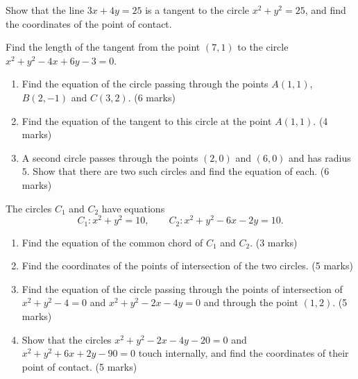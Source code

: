 \documentclass[11pt]{article}
\newcounter{popsec}
\newcounter{popsub}
\newcommand{\courssub}[1]{%
  \stepcounter{popsub}%
  \par\vspace{9pt}\noindent{\popxbold\fontsize{11.5}{13}\selectfont\color{popink}{\color{poporange}\thepopsec.\thepopsub}\hspace{6pt}#1}\par\nopagebreak\vspace{4pt}
}
\begin{document}
\begin{exercice}
Show that the line $3x + 4y = 25$ is a tangent to the circle $x^2 + y^2 = 25$, and find the coordinates of the point of contact.
\end{exercice}

\begin{exercice}
Find the length of the tangent from the point $(7, 1)$ to the circle $x^2 + y^2 - 4x + 6y - 3 = 0$.
\end{exercice}

\courssub{I prepare for the GCE}

\begin{exercice}
\begin{enumerate}
\item Find the equation of the circle passing through the points $A(1, 1)$, $B(2, -1)$ and $C(3, 2)$. \hfill (6 marks)
\item Find the equation of the tangent to this circle at the point $A(1, 1)$. \hfill (4 marks)
\item A second circle passes through the points $(2, 0)$ and $(6, 0)$ and has radius $5$. Show that there are two such circles and find the equation of each. \hfill (6 marks)
\end{enumerate}
\end{exercice}

\begin{exercice}
The circles $C_1$ and $C_2$ have equations
\[ C_1 : x^2 + y^2 = 10, \qquad C_2 : x^2 + y^2 - 6x - 2y = 10. \]
\begin{enumerate}
\item Find the equation of the common chord of $C_1$ and $C_2$. \hfill (3 marks)
\item Find the coordinates of the points of intersection of the two circles. \hfill (5 marks)
\item Find the equation of the circle passing through the points of intersection of $x^2 + y^2 - 4 = 0$ and $x^2 + y^2 - 2x - 4y = 0$ and through the point $(1, 2)$. \hfill (5 marks)
\item Show that the circles $x^2 + y^2 - 2x - 4y - 20 = 0$ and $x^2 + y^2 + 6x + 2y - 90 = 0$ touch internally, and find the coordinates of their point of contact. \hfill (5 marks)
\end{enumerate}
\end{exercice}
\end{document}
